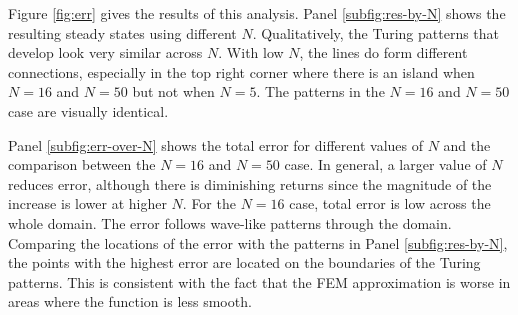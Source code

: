 Figure \ref{fig:err} gives the results of this analysis. Panel \ref{subfig:res-by-N} shows the resulting steady states using different $N$. Qualitatively, the Turing patterns that develop look very similar across $N$. With low $N$, the lines do form different connections, especially in the top right corner where there is an island when $N = 16$ and $N = 50$ but not when $N = 5$. The patterns in the $N = 16$ and $N = 50$ case are visually identical.

Panel \ref{subfig:err-over-N} shows the total error for different values of $N$ and the comparison between the $N = 16$ and $N = 50$ case. In general, a larger value of $N$ reduces error, although there is diminishing returns since the magnitude of the increase is lower at higher $N$. For the $N = 16$ case, total error is low across the whole domain. The error follows wave-like patterns through the domain. Comparing the locations of the error with the patterns in Panel \ref{subfig:res-by-N}, the points with the highest error are located on the boundaries of the Turing patterns. This is consistent with the fact that the FEM approximation is worse in areas where the function is less smooth.
